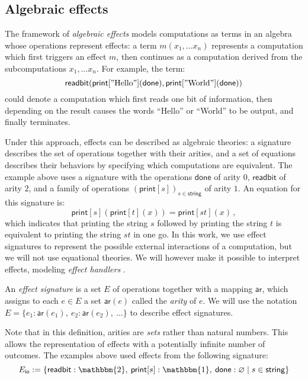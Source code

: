 \documentclass[sigplan,screen]{acmart}
\newcommand{\kw}[1]{\ensuremath{ \mathsf{#1} }}
\begin{document}
\subsection{Algebraic effects} \label{sec:bg:sig} %

The framework of \emph{algebraic effects}
models computations as terms in an algebra
whose operations represent effects:
a term $m(x_1, \ldots x_n)$
represents a computation which first
triggers an effect $m$,
then continues as a computation derived from
the subcomputations $x_1, \ldots x_n$.
For example,
the term:
\[
    \kw{readbit}(
      \kw{print}["\text{Hello}"](\kw{done}),
      \kw{print}["\text{World}"](\kw{done}))
\]
could denote a computation which
first reads one bit of information,
then depending on the result
causes the words ``Hello'' or ``World'' to be output,
and finally terminates.

Under this approach,
effects can be described as algebraic theories:
a signature describes the set of operations together with their arities,
and a set of equations describes their behaviors
by specifying which computations are equivalent.
The example above uses a signature with the operations
$\kw{done}$ of arity $0$,
$\kw{readbit}$ of arity $2$,
and a family of operations $(\kw{print}[s])_{s \in \kw{string}}$
of arity $1$.
An equation for this signature is:
\[
    \kw{print}[s](\kw{print}[t](x)) =
    \kw{print}[st](x) \,,
\]
which indicates that
printing the string $s$ followed by
printing the string $t$ is equivalent to
printing the string $st$ in one go.
In this work,
we use effect signatures to represent
the possible external interactions
of a computation,
but we will not use equational theories.
We will however make it possible to interpret effects,
modeling \emph{effect handlers} \cite{eff}.

\begin{definition}
An \emph{effect signature}
is a set $E$ of operations
together with a mapping $\kw{ar}$,
which assigns to each $e \in E$ a set $\kw{ar}(e)$
called the \emph{arity} of $e$.
We will use the notation
$E = \{ e_1 : \kw{ar}(e_1), \: e_2 : \kw{ar}(e_2), \: \ldots \}$
to describe effect signatures.
\end{definition}

Note that in this definition,
arities are \emph{sets} rather than natural numbers.
This allows the representation of effects
with a potentially infinite number of outcomes.
The examples above
used effects from the following signature:
\[
  E_\kw{io} :=
  \{ \kw{readbit} : \mathbbm{2}, \:
     \kw{print}[s] : \mathbbm{1}, \:
     \kw{done} : \varnothing \mid
     s \in \kw{string} \}
\]
\end{document}
